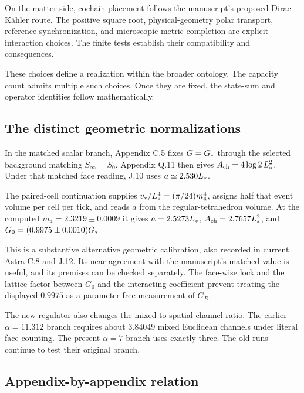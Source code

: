 On the matter side, cochain placement follows the manuscript's proposed Dirac--Kähler route. The positive square root, physical-geometry polar transport, reference synchronization, and microscopic metric completion are explicit interaction choices. The finite tests establish their compatibility and consequences.

These choices define a realization within the broader ontology. The capacity count admits multiple such choices. Once they are fixed, the state-sum and operator identities follow mathematically.

\subsection{The distinct geometric normalizations}

In the matched scalar branch, Appendix C.5 fixes $G=G_*$ through the selected background matching $S_\infty=S_0$. Appendix Q.11 then gives $A_{\rm ch}=4\log2\,L_*^2$. Under that matched face reading, J.10 uses $a\simeq2.530L_*$.

The paired-cell continuation supplies $v_*/L_*^4=(\pi/24)m_4^4$, assigns half that event volume per cell per tick, and reads $a$ from the regular-tetrahedron volume. At the computed $m_4=2.3219\pm0.0009$ it gives $a=2.5273L_*$, $A_{\rm ch}=2.7657L_*^2$, and $G_0=(0.9975\pm0.0010)G_*$.

This is a substantive alternative geometric calibration, also recorded in current Astra C.8 and J.12. Its near agreement with the manuscript's matched value is useful, and its premises can be checked separately. The face-wise lock and the lattice factor between $G_0$ and the interacting coefficient prevent treating the displayed $0.9975$ as a parameter-free measurement of $G_R$.

The new regulator also changes the mixed-to-spatial channel ratio. The earlier $\alpha=11.312$ branch requires about $3.84049$ mixed Euclidean channels under literal face counting. The present $\alpha=7$ branch uses exactly three. The old runs continue to test their original branch.

\subsection{Appendix-by-appendix relation}

